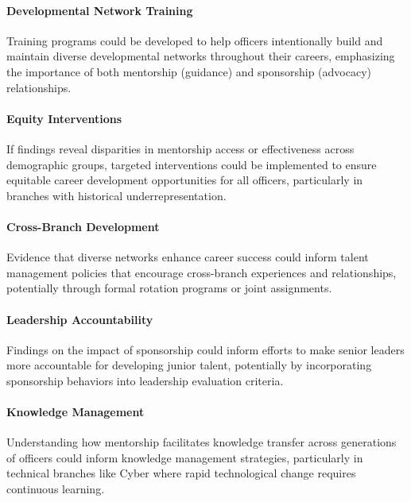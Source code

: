 \documentclass[main.tex]{subfiles}
\begin{document}
\paragraph{Developmental Network Training} Training programs could be developed to help officers intentionally build and maintain diverse developmental networks throughout their careers, emphasizing the importance of both mentorship (guidance) and sponsorship (advocacy) relationships.

\paragraph{Equity Interventions} If findings reveal disparities in mentorship access or effectiveness across demographic groups, targeted interventions could be implemented to ensure equitable career development opportunities for all officers, particularly in branches with historical underrepresentation.

\paragraph{Cross-Branch Development} Evidence that diverse networks enhance career success could inform talent management policies that encourage cross-branch experiences and relationships, potentially through formal rotation programs or joint assignments.

\paragraph{Leadership Accountability} Findings on the impact of sponsorship could inform efforts to make senior leaders more accountable for developing junior talent, potentially by incorporating sponsorship behaviors into leadership evaluation criteria.

\paragraph{Knowledge Management} Understanding how mentorship facilitates knowledge transfer across generations of officers could inform knowledge management strategies, particularly in technical branches like Cyber where rapid technological change requires continuous learning.

\end{document}
